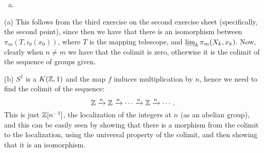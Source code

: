 \documentclass[a4paper,11pt,english]{article}
\DeclareMathOperator{\holim}{holim}
\begin{document}
\begin{exercise}[1]
\begin{enumerate}[(a)]
By the construction of the conjugation $(\omega_n)_\star$, we may defines a
homeomorphism $h_n : S^m \times [0,1] \to V$, such that $\wtil H_n = H_n' \circ
h_n$ defines a homotopy from $\xi_n$ to $p_n \circ \xi$ and $\wtil H_n(x_0,-) =
\omega_n$. 


By the exponential adjunction $\til H_n$ defines a map $\bar H_n: S^m \to
P_n^{[0,1]}$. 

By the construction of $\bar H_n$, $\bar H_n(x_0) = \omega_n$ and $\bar H_{n+1}
(x)(1) = p( \xi_{n}(x) ) = p (\bar H_n(x)(0))$, so $\bar H = (\bar H_n)_{n \ge
0}$ represent an element in $\pi_m(\holim_n P_n,\omega)$.

Also $q_n (\bar H(x)) = \bar H_n(x)(0) = \xi_n (x)$ for all $x\in S^m$, so
$\pi_m(q_n)(\bar H) = \xi$.

\item %

\end{enumerate}
\end{exercise}

\begin{exercise}[2]

(a) This follows from the third exercise on the second exercise sheet (specifically, the second point), since then we have that there is an isomorphism between $\pi_m(T,i_0(x_0))$, where $T$ is the mapping telescope, and $\colim_k\pi_m(X_k,x_k)$. Now, clearly when $n\ne m$ we have that the colimit is zero, otherwise it is the colimit of the sequence of groups given.

(b) $S^1$ is a $K(\mathbb{Z},1)$ and the map $f$ induces multiplication by $n$, hence we need to find the colimit of the sequence:
\[\mathbb{Z}\xrightarrow{n}\mathbb{Z}\xrightarrow{n}\cdots\xrightarrow{n}\mathbb{Z}\xrightarrow{n}\cdots.\]
This is just $\mathbb{Z}[n^{-1}]$, the localization of the integers at $n$ (as an abelian group), and this can be easily seen by showing that there is a morphism from the colimit to the localization, using the universal property of the colimit, and then showing that it is an isomorphism.
\end{exercise}
\end{document}
